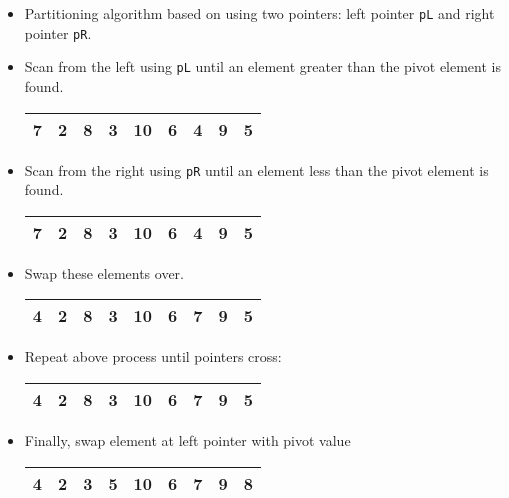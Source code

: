 \documentclass[a4paper,12pt]{article}
\begin{document}
\begin{itemize}[leftmargin=*]
\item Partitioning algorithm based on using two pointers: left pointer \texttt{pL} and right pointer \texttt{pR}.

\item Scan from the left using \texttt{pL} until an element greater than the pivot element is found.

\begin{center}
\begin{tabular}{|c|c|c|c|c|c|c|c|c|}
\hline
7 & 2 & 8 & 3 & 10 & 6 & 4 & 9 & 5 \\
\hline
\end{tabular}
\end{center}

\item Scan from the right using \texttt{pR} until an element less than the pivot element is found.

\begin{center}
\begin{tabular}{|c|c|c|c|c|c|c|c|c|}
\hline
7 & 2 & 8 & 3 & 10 & 6 & 4 & 9 & 5 \\
\hline
\end{tabular}
\end{center}

\item Swap these elements over.

\begin{center}
\begin{tabular}{|c|c|c|c|c|c|c|c|c|}
\hline
4 & 2 & 8 & 3 & 10 & 6 & 7 & 9 & 5 \\
\hline
\end{tabular}
\end{center}
\end{itemize}


\vspace{1em}

\begin{itemize}[leftmargin=*]
\item Repeat above process until pointers cross:

\begin{center}
\begin{tabular}{|c|c|c|c|c|c|c|c|c|}
\hline
4 & 2 & 8 & 3 & 10 & 6 & 7 & 9 & 5 \\
\hline
\end{tabular}
\end{center}

\item Finally, swap element at left pointer with pivot value

\begin{center}
\begin{tabular}{|c|c|c|c|c|c|c|c|c|}
\hline
4 & 2 & 3 & 5 & 10 & 6 & 7 & 9 & 8 \\
\hline
\end{tabular}
\end{center}

\end{itemize}
\end{document}
